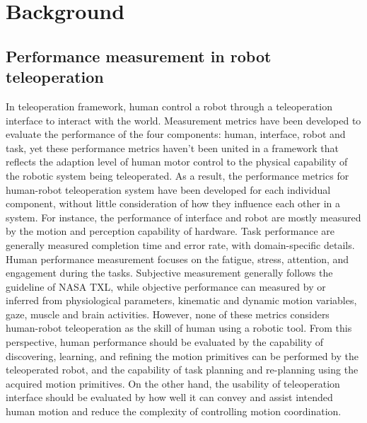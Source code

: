 
\section{Background}\label{sec:back}

\subsection{Performance measurement in robot teleoperation}\label{sec:back-performance}
In teleoperation framework, human control a robot through a teleoperation interface to interact with the world. 
Measurement metrics have been developed to evaluate the performance of the four components: human, interface, robot and task, yet these performance metrics haven’t been united in a framework that reflects the adaption level  of human motor control to the physical capability of the robotic system being teleoperated. 
As a result, the performance metrics for human-robot teleoperation system have been developed for each individual component, without little consideration of how they influence each other in a system. For instance, the performance of interface and robot are mostly measured by the motion and perception capability of hardware. Task performance are generally measured completion time and error rate, with domain-specific details. Human performance measurement focuses on the fatigue, stress, attention, and engagement during the tasks. Subjective measurement generally follows the guideline of NASA TXL, while objective performance can measured by or inferred from physiological parameters, kinematic and dynamic motion variables, gaze, muscle and brain activities. 
However, none of these metrics considers human-robot teleoperation as the skill of human using a robotic tool. From this perspective, human performance should be evaluated by the capability of discovering, learning, and refining the motion primitives can be performed by the teleoperated robot, and the capability of task planning and re-planning using the acquired motion primitives. On the other hand, the usability of teleoperation interface should be evaluated by how well it can convey and assist intended human motion and reduce the complexity of controlling motion coordination. 

